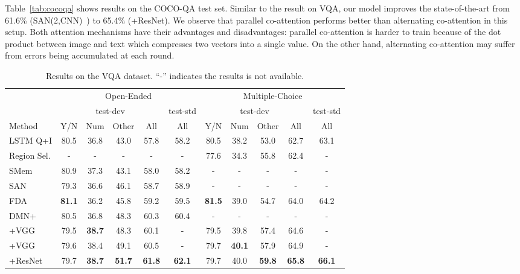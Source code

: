\documentclass{article}
\begin{document}
Table~\ref{tab:cocoqa} shows results on the COCO-QA test set. Similar to the result on VQA, our model improves the state-of-the-art from 61.6\% (SAN(2,CNN)~\cite{yang2015stacked}) to 65.4\% (+ResNet). We observe that parallel co-attention performs better than alternating co-attention in this setup. Both attention mechanisms have their advantages and disadvantages: parallel co-attention is harder to train because of the dot product between image and text which compresses two vectors into a single value. On the other hand, alternating co-attention may suffer from errors being accumulated at each round. \begin{table}[t]\footnotesize
\setlength{\tabcolsep}{5.5pt}
  \caption{Results on the VQA dataset. ``-'' indicates the results is not available.}\centering
  \begin{tabular}{l c c c c c c c c c c}
    \toprule
    \multicolumn{1}{c}{} & \multicolumn{5}{c}{Open-Ended}  & \multicolumn{5}{c}{Multiple-Choice}\\
   \cmidrule(r){2-6}
   \cmidrule(r){7-11}
    \multicolumn{1}{c}{}   & \multicolumn{4}{c}{test-dev}  & \multicolumn{1}{c}{test-std}   & \multicolumn{4}{c}{test-dev}  & \multicolumn{1}{c}{test-std} \\
    \cmidrule(r){2-5}
    \cmidrule(r){6-6}    
    \cmidrule(r){7-10}
    \cmidrule(r){11-11}
    Method  & Y/N  & Num & Other & All & All & Y/N  & Num & Other & All & All\\
    \midrule	    
    LSTM Q+I \cite{antol2015vqa}& 80.5 & 36.8 & 43.0 & 57.8 & 58.2 & 80.5 & 38.2 & 53.0 & 62.7 & 63.1  \\
	Region Sel. \cite{shih2015look} & - & - & - & - & - & 77.6 & 34.3 & 55.8 & 62.4& - \\   
    SMem \cite{xu2015ask} & 80.9 &  37.3  & 43.1  & 58.0 & 58.2 & - & - & - & - & - \\
    SAN \cite{yang2015stacked}  & 79.3 &  36.6  & 46.1   &  58.7 & 58.9 & - & - & - & - & - \\
    FDA \cite{Ilievski2016}  & \textbf{81.1} &  36.2  & 45.8   &  59.2 & 59.5 & \textbf{81.5} &  39.0 & 54.7 & 64.0 & 64.2 \\
    DMN+ \cite{xiong2016dynamic} & 80.5 &  36.8 &  48.3  & 60.3  & 60.4 & - & - & - & - & - \\
    \midrule	    
    +VGG & 79.5 & \textbf{38.7} & 48.3 & 60.1 & - & 79.5 & 39.8 & 57.4 & 64.6 &-\\
    +VGG & 79.6 & 38.4 & 49.1 & 60.5 & - & 79.7 & \textbf{40.1} & 57.9 & 64.9 &-\\    
    +ResNet & 79.7 &  \textbf{38.7} & \textbf{51.7} & \textbf{61.8} & \textbf{62.1} & 79.7 & 40.0 & \textbf{59.8} & \textbf{65.8} & \textbf{66.1}\\
    \bottomrule
  \end{tabular}
  \label{tab:vqa}
\end{table}  
\end{document}
